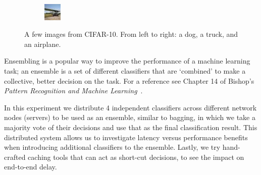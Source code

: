 \documentclass[12pt]{article}
\begin{document}
\begin{figure}
\begin{subfigure}[b]{0.2\textwidth}
    \end{subfigure}
    ~
    \begin{subfigure}[b]{0.2\textwidth}
        \includegraphics[width=\textwidth]{image5.jpeg}
    \end{subfigure}
    \caption{A few images from CIFAR-10. From left to right: a dog, a truck, and an airplane.}
    \label{fig:cifar10_images}
\end{figure}

Ensembling is a popular way to improve the performance of a machine learning task; an ensemble is a set of different classifiers that are ‘combined’ to make a collective, better decision on the task. 
For a reference see Chapter 14 of Bishop's \emph{Pattern Recognition and Machine Learning}~\cite{bishop}.


In this experiment we distribute 4 independent classifiers across different network nodes (servers) to be used as an ensemble, similar to bagging, in which we take a majority vote of their decisions and use that as the final classification result. This distributed system allows us to investigate latency versus performance benefits when introducing additional classifiers to the ensemble. Lastly, we try hand-crafted caching tools that can act as short-cut decisions, to see the impact on end-to-end delay.
\end{document}
